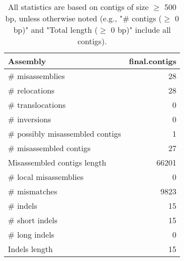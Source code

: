 \documentclass[12pt,a4paper]{article}
\begin{document}
\begin{table}[ht]
\begin{center}
\caption{All statistics are based on contigs of size $\geq$ 500 bp, unless otherwise noted (e.g., "\# contigs ($\geq$ 0 bp)" and "Total length ($\geq$ 0 bp)" include all contigs).}
\begin{tabular}{|l*{1}{|r}|}
\hline
Assembly & final.contigs \\ \hline
\# misassemblies & 28 \\ \hline
\hspace{5mm}\# relocations & 28 \\ \hline
\hspace{5mm}\# translocations & 0 \\ \hline
\hspace{5mm}\# inversions & 0 \\ \hline
\# possibly misassembled contigs & 1 \\ \hline
\# misassembled contigs & 27 \\ \hline
Misassembled contigs length & 66201 \\ \hline
\# local misassemblies & 0 \\ \hline
\# mismatches & 9823 \\ \hline
\# indels & 15 \\ \hline
\hspace{5mm}\# short indels & 15 \\ \hline
\hspace{5mm}\# long indels & 0 \\ \hline
Indels length & 15 \\ \hline
\end{tabular}
\end{center}
\end{table}
\end{document}
